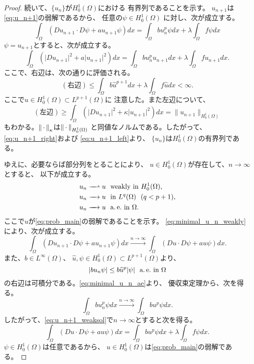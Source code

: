 \begin{proof}
 続いて、$\{u_n\}$が$H_0^1(\Omega)$における
 有界列であることを示す。
 $u_{n+1}$は\eqref{eq:u_n+1}の弱解であるから、
 任意の$\psi \in H_0^1(\Omega)$
 に対し、次が成立する。
 \begin{equation}
  \int_\Omega (Du_{n+1} \cdot D\psi + a u_{n+1} \psi) dx 
   = \int_\Omega bu_n^p \psi dx + \lambda \int_\Omega f\psi dx
   \label{eq:u_n+1_weaksol}
 \end{equation}
 $\psi = u_{n+1}$とすると、次が成立する。
 \[
 \int_\Omega (\lvert Du_{n+1} \rvert^2 
 + a \lvert u_{n+1} \rvert^2) dx 
 = \int_\Omega bu_n^p u_{n+1} dx 
 + \lambda \int_\Omega f u_{n+1} dx.
 \]
 ここで、右辺は、次の通りに評価される。
 \begin{equation}
  (\text{右辺}) \leq \int_\Omega b\hat{u}^{p+1} dx + \lambda
   \int_\Omega f \hat{u} dx < \infty. \label{eq:u_n+1_right}
 \end{equation}
 ここで$\hat{u} \in H_0^1(\Omega) \subset L^{p+1}(\Omega)$に
 注意した。また左辺について、
 \begin{equation}
  (\text{左辺}) \geq \int_\Omega \left( \lvert Du_{n+1} \rvert^2 + \kappa
   \lvert u_{n+1} \rvert^2 \right) dx = \| u_{n+1} \|_{H_0^1(\Omega)}
  \label{eq:u_n+1_left}
 \end{equation}
 もわかる。$\left\|\, \cdot \, \right\|_\kappa$は$\left\|\, \cdot \, \right\|_{H_0^1(\Omega)}$
 と同値なノルムである。したがって、\eqref{eq:u_n+1_right}および
 \eqref{eq:u_n+1_left}より、
 $\{u_n\}$は$H_0^1(\Omega)$の有界列である。

 ゆえに、必要ならば部分列をとることにより、
 $u \in H_0^1(\Omega)$が存在して、$n \to \infty$とすると、
 以下が成立する。
 \begin{align}
  u_n \xrightharpoonup{ \mbox{ ~ } } u & \ \ \text{weakly~} \tin
  H_0^1(\Omega), \label{eq:minimal_u_n_weakly} \\
  u_n \xrightarrow{ \mbox{ ~ } } u & \ \ \tin L^q(\Omega) \notag \ \
   (q < p+1), \\
  u_n \xrightarrow{ \mbox{ ~ } } u & \ \ \ae \tin \Omega. 
    \label{eq:minimal_u_n_ae}
 \end{align}
 ここで$u$が\ref{eq:prob_main}の弱解であることを示す。
 \eqref{eq:minimal_u_n_weakly}により、次が成立する。
 \[
 \int_\Omega (Du_{n+1} \cdot D\psi + a u_{n+1} \psi) dx
 \xrightarrow{n \to \infty}
 \int_\Omega (Du \cdot D\psi + a u \psi) dx.
 \]
 また、$b \in L^\infty(\Omega)$、
 $\hat{u}, \psi \in H_0^1(\Omega) \subset L^{p+1}(\Omega)$より、
 \[
  \left\lvert bu_n \psi \right\rvert \leq b \widehat{u}^p \lvert\psi\rvert \ \ \text{a.\,e.}~
 \text{in}~ \Omega
 \]
 の右辺は可積分である。\eqref{eq:minimal_u_n_ae}より、
 優収束定理から、次を得る。
 \[
 \int_\Omega bu_n^p \psi dx \xrightarrow{n \to \infty} 
 \int_\Omega bu^p \psi dx.
 \]
 したがって、\eqref{eq:u_n+1_weaksol}で$n \to \infty$とすると次を得る。
 \begin{equation}
  \int_\Omega (Du \cdot D\psi + a u \psi) dx 
   = \int_\Omega bu^p \psi dx + \lambda \int_\Omega f\psi dx.
   \label{eq:minimal_u_weaksol}
 \end{equation}
 $\psi \in H_0^1(\Omega)$は任意であるから、
 $u \in H_0^1(\Omega)$は\ref{eq:prob_main}の弱解である。
 

\end{proof}
